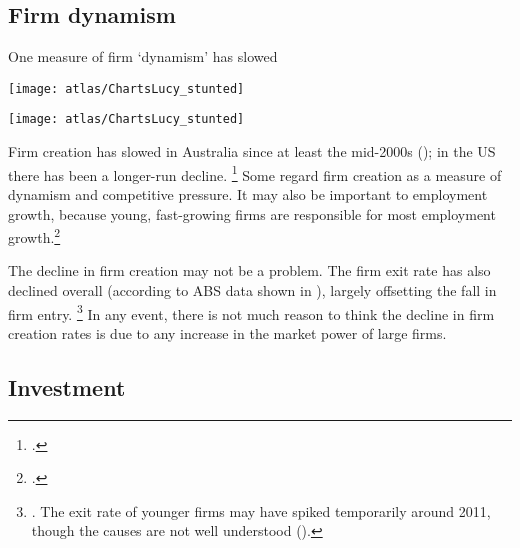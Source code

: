 \subsection{Firm dynamism}

\begin{figureTop}
    \caption{One measure of firm `dynamism' has slowed\label{fig:dynamism}}
     \vspace{3pt} 
    \texttt{[image: atlas/ChartsLucy\_stunted]}\vspace{5pt}
    
    \texttt{[image: atlas/ChartsLucy\_stunted]} 
\end{figureTop}

Firm creation has slowed in Australia since at least the mid-2000s (); in the US there has been a longer-run decline.%
\footcites{CEAcompetitionbriefmay2016, Furman_preso_2016} 
Some regard firm creation as a measure of dynamism and competitive pressure. It may also be important to employment growth, because young, fast-growing firms are responsible for most employment growth.\footcite{Industry_2015}

The decline in firm creation may not be a problem. The firm exit rate has also declined overall (according to ABS data shown in ), largely offsetting the fall in firm entry.%
    \footnote{\textcites{Breunig_2007}{IllusionsEntrepreneur2010}.
The exit rate of younger firms may have spiked temporarily around 2011, though the causes are not well understood (\textcite{Bakhtiari_2017}).}
In any event, there is not much reason to think the decline in firm creation rates is due to any increase in the market power of large firms. 


\subsection{Investment}


